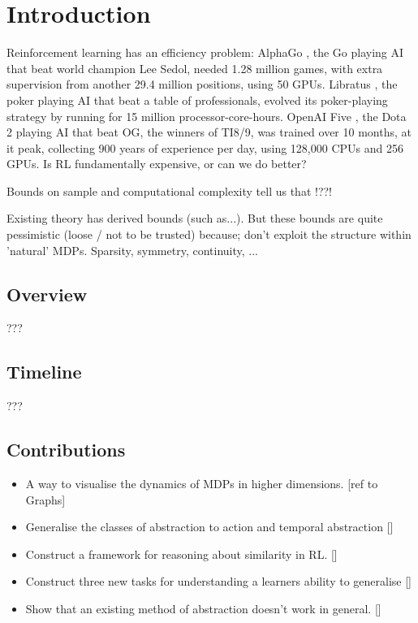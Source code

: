 \chapter{Introduction}\label{C:intro}

Reinforcement learning has an efficiency problem: AlphaGo \cite{Silver2016a}, the Go
playing AI that beat world champion Lee Sedol, needed 1.28 million games, with
extra supervision from another 29.4 million positions, using 50 GPUs.
Libratus \cite{Brown2018b}, the poker playing AI that beat a table of professionals,
evolved its poker-playing strategy by running for 15 million processor-core-hours.
OpenAI Five \cite{Berner2019}, the Dota 2 playing AI that beat OG, the winners of TI8/9, was
trained over 10 months, at it peak, collecting 900 years of experience per day, using
128,000 CPUs and 256 GPUs. Is RL fundamentally expensive, or can we do better?

Bounds on sample and computational complexity tell us that !??!



Existing theory has derived bounds (such as...). But these bounds are quite pessimistic (loose / not to be trusted) because;
don't exploit the structure within 'natural' MDPs. Sparsity, symmetry, continuity, ...

\section{Overview}

???

\section{Timeline}

???


\section{Contributions}

\begin{itemize}
  \item A way to visualise the dynamics of MDPs in higher dimensions. [ref to Graphs]
  \item Generalise the classes of abstraction to action and temporal abstraction []
  \item Construct a framework for reasoning about similarity in RL. []
  \item Construct three new tasks for understanding a learners ability to generalise []
  \item Show that an existing method of abstraction doesn't work in general. []
\end{itemize}
